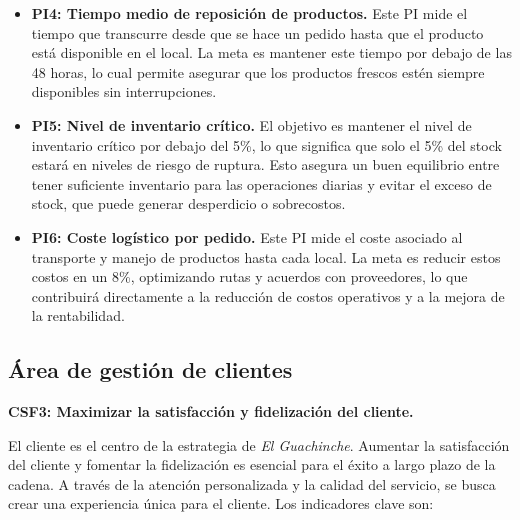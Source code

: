 \documentclass[12pt]{opticajnl}
\begin{document}
\begin{itemize}
    \item \textbf{PI4: Tiempo medio de reposición de productos.}  
    Este PI mide el tiempo que transcurre desde que se hace un pedido hasta que el producto está disponible en el local. La meta es mantener este tiempo por debajo de las 48 horas, lo cual permite asegurar que los productos frescos estén siempre disponibles sin interrupciones.
    
    \item \textbf{PI5: Nivel de inventario crítico.}  
    El objetivo es mantener el nivel de inventario crítico por debajo del 5\%, lo que significa que solo el 5\% del stock estará en niveles de riesgo de ruptura. Esto asegura un buen equilibrio entre tener suficiente inventario para las operaciones diarias y evitar el exceso de stock, que puede generar desperdicio o sobrecostos.
    
    \item \textbf{PI6: Coste logístico por pedido.}  
    Este PI mide el coste asociado al transporte y manejo de productos hasta cada local. La meta es reducir estos costos en un 8\%, optimizando rutas y acuerdos con proveedores, lo que contribuirá directamente a la reducción de costos operativos y a la mejora de la rentabilidad.
\end{itemize}

\subsection{Área de gestión de clientes}

\textbf{CSF3: Maximizar la satisfacción y fidelización del cliente.}

El cliente es el centro de la estrategia de \textit{El Guachinche}. Aumentar la satisfacción del cliente y fomentar la fidelización es esencial para el éxito a largo plazo de la cadena. A través de la atención personalizada y la calidad del servicio, se busca crear una experiencia única para el cliente. Los indicadores clave son:
\end{document}
